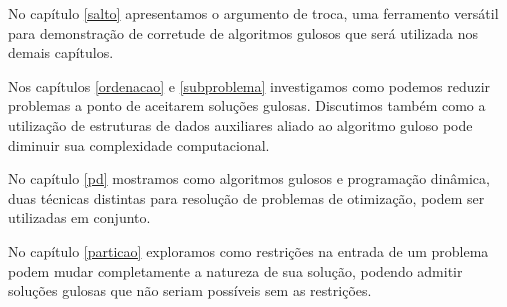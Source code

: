 No capítulo \ref{salto} apresentamos o argumento de troca, uma ferramento versátil para demonstração de corretude de algoritmos gulosos que será utilizada nos demais capítulos.

Nos capítulos \ref{ordenacao} e \ref{subproblema} investigamos como podemos reduzir problemas a ponto de aceitarem soluções gulosas. Discutimos também como a utilização de estruturas de dados auxiliares aliado ao algoritmo guloso pode diminuir sua complexidade computacional.

No capítulo \ref{pd} mostramos como algoritmos gulosos e programação dinâmica, duas técnicas distintas para resolução de problemas de otimização, podem ser utilizadas em conjunto.

No capítulo \ref{particao} exploramos como restrições na entrada de um problema podem mudar completamente a natureza de sua solução, podendo admitir soluções gulosas que não seriam possíveis sem as restrições.

